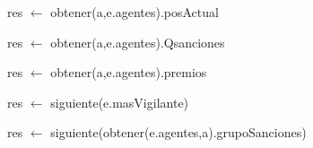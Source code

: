 \begin{algorithm}[H]
\begin{algorithmic}[1]
 
    \State res $\gets$ obtener(a,e.agentes).posActual
\EndFunction
\end{algorithmic}
\end{algorithm}

\begin{algorithm}[H]
\begin{algorithmic}[1]
 
    \State res $\gets$ obtener(a,e.agentes).Qsanciones
\EndFunction
\end{algorithmic}
\end{algorithm}

\begin{algorithm}[H]
\begin{algorithmic}[1]
 
    \State res $\gets$ obtener(a,e.agentes).premios
\EndFunction
\end{algorithmic}
\end{algorithm}

\begin{algorithm}[H]
\begin{algorithmic}[1]
 
    \State res $\gets$ siguiente(e.masVigilante)
\EndFunction
\end{algorithmic}
\end{algorithm}


\begin{algorithm}[H]
\begin{algorithmic}[1]
 
    \State res $\gets$ siguiente(obtener(e.agentes,a).grupoSanciones)
\EndFunction
\end{algorithmic}
\end{algorithm}

